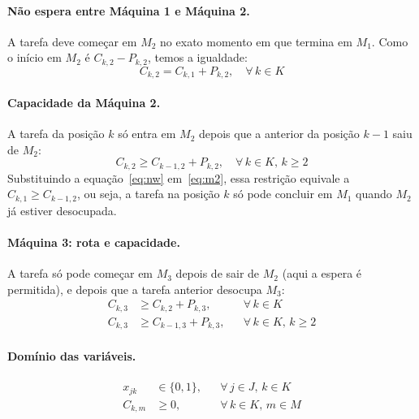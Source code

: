 \documentclass[11pt,a4paper]{article}
\begin{document}
\paragraph{Não espera entre Máquina 1 e Máquina 2.} A tarefa deve começar em $M_2$ no exato momento em que termina em $M_1$. Como o início em $M_2$ é $C_{k,2} - P_{k,2}$, temos a igualdade:
\begin{equation}
    C_{k,2} = C_{k,1} + P_{k,2}, \quad \forall\, k \in K \label{eq:nw}
\end{equation}

\paragraph{Capacidade da Máquina 2.} A tarefa da posição $k$ só entra em $M_2$ depois que a anterior da posição $k-1$ saiu de $M_2$:
\begin{equation}
    C_{k,2} \ge C_{k-1,2} + P_{k,2}, \quad \forall\, k \in K,\, k \ge 2 \label{eq:m2}
\end{equation}
Substituindo a equação~\eqref{eq:nw} em~\eqref{eq:m2}, essa restrição equivale a $C_{k,1} \ge C_{k-1,2}$, ou seja, a tarefa na posição $k$ só pode concluir em $M_1$ quando $M_2$ já estiver desocupada.

\paragraph{Máquina 3: rota e capacidade.} A tarefa só pode começar em $M_3$ depois de sair de $M_2$ (aqui a espera é permitida), e depois que a tarefa anterior desocupa $M_3$:
\begin{align}
    C_{k,3} &\ge C_{k,2} + P_{k,3}, && \forall\, k \in K \label{eq:m3a}\\
    C_{k,3} &\ge C_{k-1,3} + P_{k,3}, && \forall\, k \in K,\, k \ge 2 \label{eq:m3b}
\end{align}

\paragraph{Domínio das variáveis.}
\begin{align}
    x_{jk} &\in \{0,1\}, && \forall\, j \in J,\, k \in K \label{eq:dom1}\\
    C_{k,m} &\ge 0, && \forall\, k \in K,\, m \in M \label{eq:dom2}
\end{align}
\end{document}
